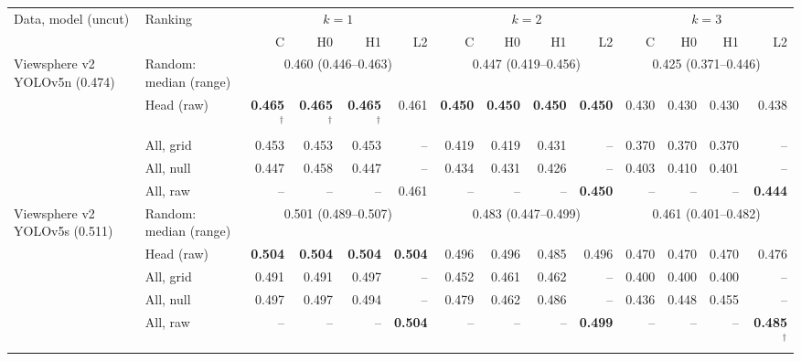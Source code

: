 \begin{tabular}{llrrrrrrrrrrrr}
\toprule
Data, model (uncut) & Ranking & \multicolumn{4}{c}{$k=1$} & \multicolumn{4}{c}{$k=2$} & \multicolumn{4}{c}{$k=3$} \\
\cmidrule(lr){3-6}\cmidrule(lr){7-10}\cmidrule(lr){11-14}
 & & C & H0 & H1 & L2 & C & H0 & H1 & L2 & C & H0 & H1 & L2 \\
\midrule
Viewsphere v2 YOLOv5n (0.474) & Random: median (range) & \multicolumn{4}{c}{0.460 (0.446--0.463)} & \multicolumn{4}{c}{0.447 (0.419--0.456)} & \multicolumn{4}{c}{0.425 (0.371--0.446)} \\
 & Head (raw) & \textbf{0.465$^\dagger$} & \textbf{0.465$^\dagger$} & \textbf{0.465$^\dagger$} & 0.461 & \textbf{0.450} & \textbf{0.450} & \textbf{0.450} & \textbf{0.450} & 0.430 & 0.430 & 0.430 & 0.438 \\
 & All, grid & 0.453 & 0.453 & 0.453 & -- & 0.419 & 0.419 & 0.431 & -- & 0.370 & 0.370 & 0.370 & -- \\
 & All, null & 0.447 & 0.458 & 0.447 & -- & 0.434 & 0.431 & 0.426 & -- & 0.403 & 0.410 & 0.401 & -- \\
 & All, raw & -- & -- & -- & 0.461 & -- & -- & -- & \textbf{0.450} & -- & -- & -- & \textbf{0.444} \\
\midrule
Viewsphere v2 YOLOv5s (0.511) & Random: median (range) & \multicolumn{4}{c}{0.501 (0.489--0.507)} & \multicolumn{4}{c}{0.483 (0.447--0.499)} & \multicolumn{4}{c}{0.461 (0.401--0.482)} \\
 & Head (raw) & \textbf{0.504} & \textbf{0.504} & \textbf{0.504} & \textbf{0.504} & 0.496 & 0.496 & 0.485 & 0.496 & 0.470 & 0.470 & 0.470 & 0.476 \\
 & All, grid & 0.491 & 0.491 & 0.497 & -- & 0.452 & 0.461 & 0.462 & -- & 0.400 & 0.400 & 0.400 & -- \\
 & All, null & 0.497 & 0.497 & 0.494 & -- & 0.479 & 0.462 & 0.486 & -- & 0.436 & 0.448 & 0.455 & -- \\
 & All, raw & -- & -- & -- & \textbf{0.504} & -- & -- & -- & \textbf{0.499} & -- & -- & -- & \textbf{0.485$^\dagger$} \\
\bottomrule
\end{tabular}
